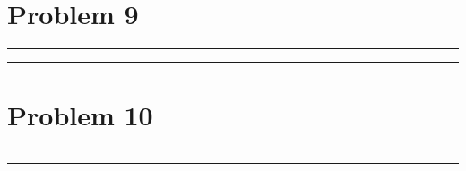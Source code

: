 \documentclass{article}
\theoremstyle{definition}
\newenvironment{solution}{\bigskip\hrule{\hfill}}{\bigskip\hrule{\hfill}} %
\begin{document}
\section*{Problem 9}

\begin{solution}


\end{solution}


\newpage


\section*{Problem 10}

\begin{solution}


\end{solution}

\end{document}
